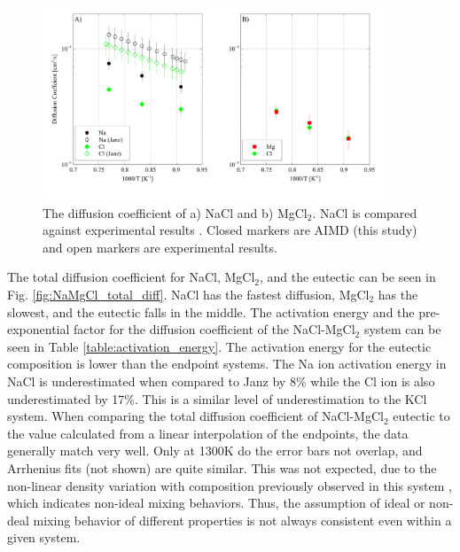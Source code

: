 \documentclass[review]{elsarticle}
\begin{document}
\begin{figure}[!h]
 \centering
 \includegraphics[width=0.9\textwidth]{diff_nacl_and_mgcl2.jpg} 
 \caption{The diffusion coefficient of a) NaCl and b) MgCl$_2$. NaCl is compared against experimental results \cite{janz_Diffusion}. Closed markers are AIMD (this study) and open markers are experimental results.}
 \label{fig:NaCl_and_MgCl2-diffuion}
\end{figure}

The total diffusion coefficient for NaCl, MgCl$_2$, and the eutectic can be seen in Fig. \ref{fig:NaMgCl_total_diff}. NaCl has the fastest diffusion, MgCl$_2$ has the slowest, and the eutectic falls in the middle.
The activation energy and the pre-exponential factor for the diffusion coefficient of the NaCl-MgCl$_2$ system can be seen in Table \ref{table:activation_energy}. The activation energy for the eutectic composition is lower than the endpoint systems. The Na ion activation energy in NaCl is underestimated when compared to Janz \cite{janz_Diffusion} by 8\% while the Cl ion is also underestimated by 17\%. This is a similar level of underestimation to the KCl system. When comparing the total diffusion coefficient of NaCl-MgCl$_2$ eutectic to the value calculated from a linear interpolation of the endpoints, the data generally match very well. Only at 1300K do the error bars not overlap, and Arrhenius fits (not shown) are quite similar. This was not expected, due to the non-linear density variation with composition previously observed in this system \cite{duemmler_naclmgcl}, which indicates non-ideal mixing behaviors. Thus, the assumption of ideal or non-deal mixing behavior of different properties is not always consistent even within a given system. 
\end{document}
